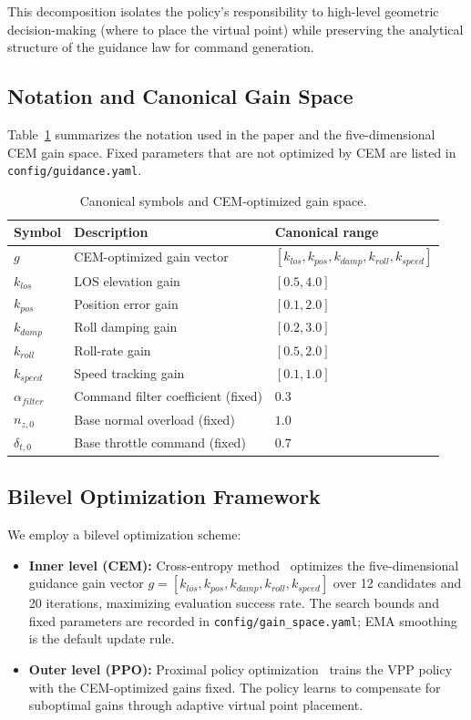 \documentclass[conference]{IEEEtran}
\begin{document}
This decomposition isolates the policy's responsibility to high-level geometric decision-making (where to place the virtual point) while preserving the analytical structure of the guidance law for command generation.

\subsection{Notation and Canonical Gain Space}\label{sec:notation}

Table~\ref{tab:symbols} summarizes the notation used in the paper and the five-dimensional CEM gain space. Fixed parameters that are not optimized by CEM are listed in \texttt{config/guidance.yaml}.

\begin{table}[t]
\centering
\caption{Canonical symbols and CEM-optimized gain space.}
\label{tab:symbols}
\begin{tabular}{lll}
\toprule
Symbol & Description & Canonical range \\
\midrule
$g$ & CEM-optimized gain vector & $[k_{los}, k_{pos}, k_{damp}, k_{roll}, k_{speed}]$ \\
$k_{los}$ & LOS elevation gain & $[0.5, 4.0]$ \\
$k_{pos}$ & Position error gain & $[0.1, 2.0]$ \\
$k_{damp}$ & Roll damping gain & $[0.2, 3.0]$ \\
$k_{roll}$ & Roll-rate gain & $[0.5, 2.0]$ \\
$k_{speed}$ & Speed tracking gain & $[0.1, 1.0]$ \\
$\alpha_{filter}$ & Command filter coefficient (fixed) & $0.3$ \\
$n_{z,0}$ & Base normal overload (fixed) & $1.0$ \\
$\delta_{t,0}$ & Base throttle command (fixed) & $0.7$ \\
\bottomrule
\end{tabular}
\end{table}

\subsection{Bilevel Optimization Framework}\label{sec:bilevel}

We employ a bilevel optimization scheme:
\begin{itemize}
    \item \textbf{Inner level (CEM):} Cross-entropy method~\cite{cem2005} optimizes the five-dimensional guidance gain vector $g = [k_{los}, k_{pos}, k_{damp}, k_{roll}, k_{speed}]$ over 12 candidates and 20 iterations, maximizing evaluation success rate. The search bounds and fixed parameters are recorded in \texttt{config/gain\_space.yaml}; EMA smoothing is the default update rule.
    \item \textbf{Outer level (PPO):} Proximal policy optimization~\cite{ppo} trains the VPP policy with the CEM-optimized gains fixed. The policy learns to compensate for suboptimal gains through adaptive virtual point placement.
\end{itemize}
\end{document}
